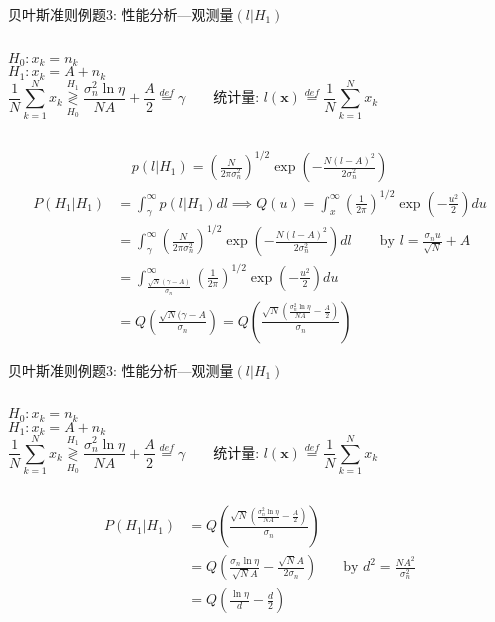 \begin{frame}[shrink]{贝叶斯准则例题3: 性能分析---观测量$(l|H_1)$}
\begin{columns}
	$H_0:x_k=n_k$\\
	$H_1:x_k=A+n_k$
	\[
	\frac{1}{N}\sum\limits_{k=1}^{N}x_k\mathop{\gtrless}\limits_{H_0}^{H_1}\frac{\sigma_n^2\ln\eta}{NA}+\frac{A}{2}\mathop{=}\limits^{def}\gamma \qquad \textbf{统计量: }l(\bm{x})\mathop{=}\limits^{def}\frac{1}{N}\sum\limits_{k=1}^{N}x_k
	\]
\end{columns}
\begin{align*}
p(l|H_1)=\left(\frac{N}{2\pi\sigma_n^2}\right)^{1/2}\exp\left(-\frac{N(l-A)^2}{2\sigma_n^2}\right)
\end{align*}
\begin{align*}
P(H_1|H_1)&=\int_{\gamma}^{\infty}p(l|H_1)dl\implies Q(u)=\int_{x}^{\infty}\left(\frac{1}{2\pi}\right)^{1/2}\exp\left(-\frac{u^2}{2}\right)du\\
&=\int_{\gamma}^{\infty}\left(\frac{N}{2\pi\sigma_n^2}\right)^{1/2}\exp\left(-\frac{N(l-A)^2}{2\sigma_n^2}\right)dl\qquad \text{by } l=\frac{\sigma_nu}{\sqrt{N}}+A\\
&=\int_{\frac{\sqrt{N}(\gamma-A)}{\sigma_n}}^{\infty}\left(\frac{1}{2\pi}\right)^{1/2}\exp\left(-\frac{u^2}{2}\right)du\\
&=Q\left(\frac{\sqrt{N}(\gamma-A}{\sigma_n}\right)=Q\left(\frac{\sqrt{N}\left(\frac{\sigma_n^2\ln\eta}{NA}-\frac{A}{2}\right)}{\sigma_n}\right)
\end{align*}
\end{frame}

\begin{frame}[shrink]{贝叶斯准则例题3: 性能分析---观测量$(l|H_1)$}
\begin{columns}
$H_0:x_k=n_k$\\
$H_1:x_k=A+n_k$
\[
\frac{1}{N}\sum\limits_{k=1}^{N}x_k\mathop{\gtrless}\limits_{H_0}^{H_1}\frac{\sigma_n^2\ln\eta}{NA}+\frac{A}{2}\mathop{=}\limits^{def}\gamma \qquad \textbf{统计量: }l(\bm{x})\mathop{=}\limits^{def}\frac{1}{N}\sum\limits_{k=1}^{N}x_k
\]
\end{columns}
\begin{align*}
P(H_1|H_1)&=Q\left(\frac{\sqrt{N}\left(\frac{\sigma_n^2\ln\eta}{NA}-\frac{A}{2}\right)}{\sigma_n}\right)\\
&=Q\left(\frac{\sigma_n\ln\eta}{\sqrt{N}A}-\frac{\sqrt{N}A}{2\sigma_n}\right)&& \text{by }d^2=\frac{NA^2}{\sigma_n^2}\\
&=Q\left(\frac{\ln\eta}{d}-\frac{d}{2}\right)
\end{align*}
\end{frame}

